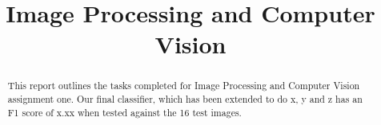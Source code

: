 \documentclass[conference]{IEEEtran}
\begin{document}
\title{Image Processing and Computer Vision\\
}
\author{
\and
{}
}


\maketitle

\begin{abstract}
This report outlines the tasks completed for Image Processing and Computer Vision assignment one. Our final classifier, which has been extended to do x, y and z has an F1 score of x.xx when tested against the 16 test images. 
\end{abstract}
\end{document}
